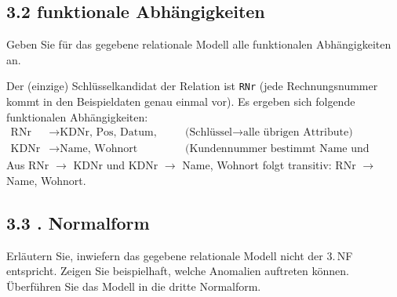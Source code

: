 \documentclass[11pt,a4paper]{article}
\begin{document}
\subsection*{3.2 \quad funktionale Abh\"angigkeiten}
Geben Sie f\"ur das gegebene relationale Modell alle funktionalen Abh\"angigkeiten an.

\begin{loesung}
Der (einzige) Schl\"usselkandidat der Relation ist \texttt{RNr} (jede Rechnungsnummer kommt in den Beispieldaten genau einmal vor). Es ergeben sich folgende funktionalen Abh\"angigkeiten:
\begin{align*}
\text{RNr} &\to \text{KDNr, Pos, Datum, Betrag} & \text{(Schl\"ussel} \to \text{alle \"ubrigen Attribute)}\\
\text{KDNr} &\to \text{Name, Wohnort} & \text{(Kundennummer bestimmt Name und Wohnort)}
\end{align*}
Aus RNr $\to$ KDNr und KDNr $\to$ Name, Wohnort folgt transitiv: RNr $\to$ Name, Wohnort.
\end{loesung}

\subsection*{3.3 . Normalform}
Erl\"autern Sie, inwiefern das gegebene relationale Modell nicht der 3.\,NF entspricht. Zeigen Sie beispielhaft, welche Anomalien auftreten k\"onnen. \"Uberf\"uhren Sie das Modell in die dritte Normalform.
\end{document}
